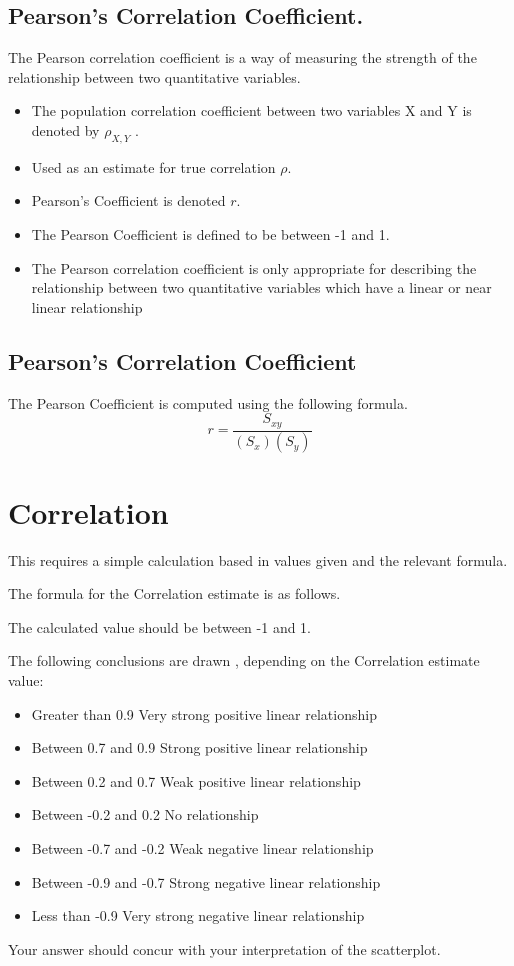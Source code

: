 \subsection{Pearson's Correlation Coefficient.}

The Pearson correlation coefficient is a way of measuring the
strength of the relationship between two quantitative variables.

\begin{itemize}
	\item The population correlation coefficient between two variables X and
	Y is denoted by $\rho_{X,Y}$ .
	\item Used as an estimate for true correlation $\rho$.
	\item Pearson's Coefficient is denoted $r$.
	\item The Pearson Coefficient is defined to be between -1 and 1.
	\item The Pearson correlation coefficient is only appropriate for
	describing the relationship between two quantitative variables
	which have a linear or near linear relationship
\end{itemize}


\subsection{Pearson's Correlation Coefficient}
The Pearson Coefficient is computed using the following formula.
\[ r = \frac{S_{xy}}{(S_x)(S_y)} \]


\section{Correlation}

This requires a simple calculation based in values given and the relevant formula.

The formula for the Correlation estimate is as follows.

The calculated value should be between -1 and 1.

The following conclusions are drawn , depending on the Correlation estimate value:
\begin{itemize}
	\item Greater than 0.9 		Very strong positive linear relationship 
	\item Between 0.7 and 0.9		Strong positive linear relationship 
	\item Between 0.2 and 0.7	 	Weak positive linear relationship
	\item Between -0.2 and 0.2		No relationship
	\item Between -0.7 and -0.2		Weak negative linear relationship
	\item Between -0.9 and -0.7		Strong negative linear relationship
	\item Less than -0.9			Very strong negative linear relationship
\end{itemize}
Your answer should concur with your interpretation of the scatterplot.

